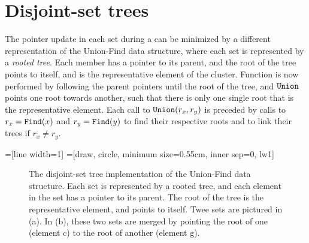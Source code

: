 \section{Disjoint-set trees}
The pointer update in each set during a  can be minimized by a different representation of the Union-Find data structure, where each set is represented by a \emph{rooted tree}. Each member has a pointer to its parent, and the root of the tree points to itself, and is the representative element of the cluster. Function  is now performed by following the parent pointers until the root of the tree, and $\texttt{Union}$ points one root towards another, such that there is only one single root that is the representative element. Each call to $\texttt{Union}(r_x,r_y)$ is preceded by calls to $r_x=\texttt{Find}(x)$ and $r_y=\texttt{Find}(y)$ to find their respective roots and to link their trees if $r_x \neq r_y$. 

=[line width=1]
=[draw, circle, minimum size=0.55cm, inner sep=0, lw1]

\begin{figure}[htpb]
  \centering
  \caption{The disjoint-set tree implementation of the Union-Find data structure. Each set is represented by a rooted tree, and each element in the set has a pointer to its parent. The root of the tree is the representative element, and points to itself. Twee sets are pictured in (a). In (b), these two sets are merged by pointing the root of one (element c) to the root of another (element g).}
  \label{fig:parentpointers}
\end{figure}

